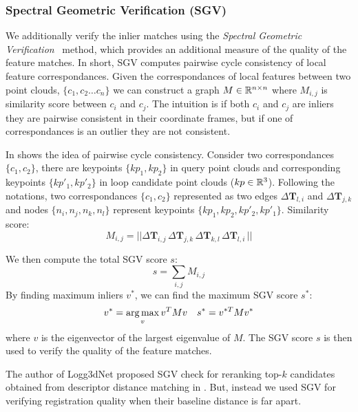 \subsubsection*{\textbf{Spectral Geometric Verification (SGV)}}
We additionally verify the inlier matches using the \emph{Spectral Geometric Verification}~\cite{vidanapathirana2023ral} method, which provides an additional measure of the quality of the feature matches. In short, SGV computes pairwise cycle consistency of local feature correspondances. Given the correspondances of local features between two point clouds, $\{c_1, c_2 \ldots c_n\}$ we can construct a graph $M \in \mathbb{R}^{n \times n}$ where $M_{i,j}$ is similarity score between $c_i$ and $c_j$. The intuition is if both $c_i$ and $c_j$ are inliers they are pairwise consistent in their coordinate frames, but if one of correspondances is an outlier they are not consistent. 

In  shows the idea of pairwise cycle consistency. Consider two correspondances $\{c_1, c_2\}$, there are keypoints $\{kp_1, kp_2\}$ in query point clouds and corresponding keypoints $\{kp'_1, kp'_2\}$ in loop candidate point clouds ($kp \in \mathbb{R}^{3}$). Following the  notations, two correspondances $\{c_1, c_2\}$ represented as two edges $\Delta\mathbf{T}_{l,i}$ and $\Delta\mathbf{T}_{j,k}$ and nodes $\{n_i, n_j, n_k, n_l\}$ represent keypoints  $\{kp_1, kp_2, kp'_2, kp'_1\}$.
Similarity score:
\begin{equation}
  M_{i,j} = ||\Delta\mathbf{T}_{i,j}\, \Delta\mathbf{T}_{j,k}\, \Delta\mathbf{T}_{k,l}\, \Delta\mathbf{T}_{l,i}\, ||
\end{equation}

We then compute the total SGV score $s$:
\begin{equation}
  s = \sum_{i,j} M_{i,j} 
\end{equation}
By finding maximum inliers $v^{*}$, we can find the maximum SGV score $s^{*}$: 
\begin{equation}
  v^{*} = \operatorname*{arg\,max}_{v} v^T M v \quad
  s^{*} = v^{*T} M v^{*}
\end{equation}
where $v$ is the eigenvector of the largest eigenvalue of $M$. The SGV score $s$ is then used to verify the quality of the feature matches.

The author of Logg3dNet proposed SGV check for reranking top-$k$ candidates obtained from descriptor distance matching in . But, instead we used SGV for verifying registration quality when their baseline distance is far apart. 

